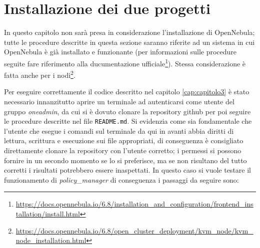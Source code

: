 \section{Installazione dei due progetti}
In questo capitolo non sarà presa in considerazione l'installazione di OpenNebula; tutte le procedure descritte in questa sezione saranno riferite ad un sistema in cui OpenNebula è già installato e funzionante (per informazioni sulle procedure seguite fare riferimento alla ducumentazione ufficiale\footnote{\url{https://docs.opennebula.io/6.8/installation\_and\_configuration/frontend\_installation/install.html}}). Stessa considerazione è fatta anche per i nodi\footnote{\url{https://docs.opennebula.io/6.8/open\_cluster\_deployment/kvm\_node/kvm\_node\_installation.html}}.\par
Per eseguire correttamente il codice descritto nel capitolo \ref{cap:capitolo3} è stato necessario innanzitutto aprire un terminale ad autenticarsi come utente del gruppo \emph{oneadmin}, da cui si è dovuto clonare la repository github per poi seguire le procedure descritte nel file \texttt{README.md}. Si evidenzia come sia fondamentale che l'utente che esegue i comandi sul terminale da qui in avanti abbia diritti di lettura, scrittura e esecuzione sui file appropriati, di conseguenza è consigliato direttamente clonare la repository con l'utente corretto; i permessi si possono fornire in un secondo momento se lo si preferisce, ma se non risultano del tutto corretti i risultati potrebbero essere inaspettati.
In questo caso si vuole testare il funzionamento di \emph{policy\_manager} di conseguenza i passaggi da seguire sono:
